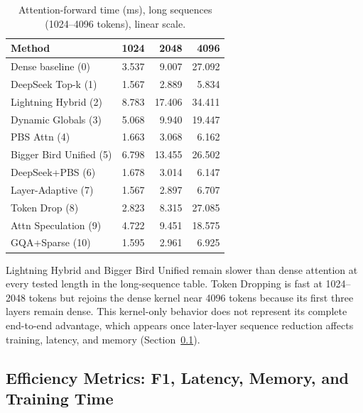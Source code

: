 \documentclass[11pt]{article}
\begin{document}
\begin{table}[ht]
  \centering
  \small
  \caption{Attention-forward time (ms), long sequences (1024--4096 tokens),
  linear scale.}
  \label{tab:long}
  \begin{tabular}{@{}lrrr@{}}
    \toprule
    Method & 1024 & 2048 & 4096 \\
    \midrule
    Dense baseline (0)        & 3.537 & 9.007  & 27.092 \\
    DeepSeek Top-k (1)        & 1.567 & 2.889  & 5.834 \\
    Lightning Hybrid (2)      & 8.783 & 17.406 & 34.411 \\
    Dynamic Globals (3)       & 5.068 & 9.940  & 19.447 \\
    PBS Attn (4)              & 1.663 & 3.068  & 6.162 \\
    Bigger Bird Unified (5)   & 6.798 & 13.455 & 26.502 \\
    DeepSeek+PBS (6)          & 1.678 & 3.014  & 6.147 \\
    Layer-Adaptive (7)        & 1.567 & 2.897  & 6.707 \\
    Token Drop (8)            & 2.823 & 8.315  & 27.085 \\
    Attn Speculation (9)      & 4.722 & 9.451  & 18.575 \\
    GQA+Sparse (10)           & 1.595 & 2.961  & 6.925 \\
    \bottomrule
  \end{tabular}
\end{table}

Lightning Hybrid and Bigger Bird Unified remain slower than dense attention
at every tested length in the long-sequence table. Token Dropping is fast at
1024--2048 tokens but rejoins the dense kernel near 4096 tokens because its
first three layers remain dense. This kernel-only behavior does not represent
its complete end-to-end advantage, which appears once later-layer sequence
reduction affects training, latency, and memory
(Section~\ref{sec:efficiency}).

\subsection{Efficiency Metrics: F1, Latency, Memory, and Training Time}
\label{sec:efficiency}
\end{document}
